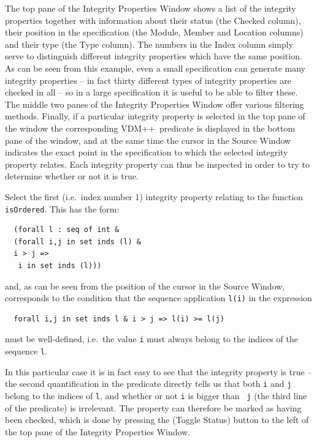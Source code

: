 \documentclass[\pformat,12pt]{article}
\newcommand{\vdmslpp}{VDM++}
\newcommand{\aaa}{\tt }
\newcommand{\guicmd}[1]{{\sf #1}}
\begin{document}
The top pane of the \guicmd{Integrity Properties Window} shows a list
of the integrity properties together with information about their
status (the \guicmd{Checked} column), their position in the specification (the
\guicmd{Module}, \guicmd{Member} and \guicmd{Location} columns) and
their type (the \guicmd{Type} column). The numbers in the
\guicmd{Index} column simply serve to distinguish different integrity
properties which have the same position. As can be seen from this
example, even a small specification can generate many integrity
properties -- in fact thirty different types of integrity properties
are checked in all -- so in a large specification it is useful to be
able to filter these. The middle two panes of the \guicmd{Integrity
  Properties Window} offer various filtering
methods. Finally, if a particular integrity 
property is selected in the top pane of the window the corresponding
\vdmslpp\ predicate is displayed in the bottom pane of the window, and
at the same time the cursor in the \guicmd{Source Window} indicates
the exact point in the specification to which the selected integrity
property relates. Each integrity property can thus be inspected in
order to try to determine whether or not it is true.



Select the first (i.e.\ index number 1) integrity property relating to
the function {\aaa isOrdered}. This has the form:



\begin{verbatim}
  (forall l : seq of int &
  (forall i,j in set inds (l) &
  i > j =>
   i in set inds (l)))
\end{verbatim}

and, as can be seen from the position of the cursor in the
\guicmd{Source Window}, corresponds to the condition that the sequence
application \verb+l(i)+ in the expression

\begin{verbatim}
  forall i,j in set inds l & i > j => l(i) >= l(j)
\end{verbatim}

must be well-defined, i.e.\ the value {\aaa i} must always belong to the
indices of the sequence {\aaa l}.

In this particular case it is in fact easy to see that the integrity
property is true -- the second quantification in the predicate
directly tells us that both {\aaa i} and {\aaa j} belong to the
indices of {\aaa l}, and whether or not {\aaa i} is bigger than {\aaa
  j} (the third line of the predicate) is irrelevant. The property can
therefore be marked as having been checked, which is done by pressing
the
(\guicmd{Toggle Status}) button to the left of the top pane of the
\guicmd{Integrity Properties Window}.
\end{document}

